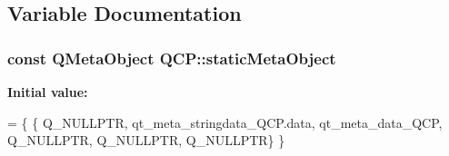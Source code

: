 \subsection{Variable Documentation}
\subsubsection[{\texorpdfstring{static\+Meta\+Object}{staticMetaObject}}]{\setlength{\rightskip}{0pt plus 5cm}const Q\+Meta\+Object Q\+C\+P\+::static\+Meta\+Object}\hypertarget{namespace_q_c_p_a07ffa1eb1537a3b1f218ff2a442b2017}{}\label{namespace_q_c_p_a07ffa1eb1537a3b1f218ff2a442b2017}
{\bfseries Initial value\+:}
\begin{DoxyCode}
= \{
    \{ Q\_NULLPTR, qt\_meta\_stringdata\_QCP.data,
      qt\_meta\_data\_QCP,  Q\_NULLPTR, Q\_NULLPTR, Q\_NULLPTR\}
\}
\end{DoxyCode}
